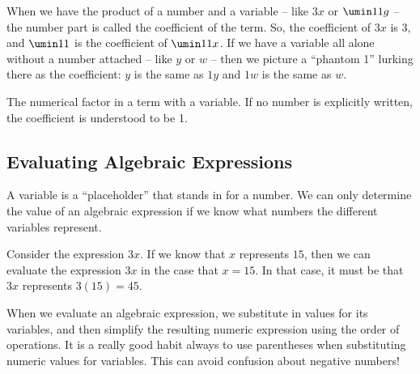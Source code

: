 When we have the product of a number and a variable -- like $3x$ or $\umin11g$ -- the number part is called the \gls{coefficient} of the term. So, the coefficient of $3x$ is 3, and $\umin11$ is the coefficient of $\umin11x$. If we have a variable all alone without a number attached -- like $y$ or $w$ -- then we picture a ``phantom 1'' lurking there as the coefficient: $y$ is the same as $1y$ and $1w$ is the same as $w$.

\begin{boxeddef}[Coefficient]
The numerical factor in a term with a variable. If no number is explicitly written, the coefficient is understood to be 1.
\end{boxeddef}

\subsection{Evaluating Algebraic Expressions}

A variable is a ``placeholder'' that stands in for a number. We can only determine the value of an algebraic expression if we know what numbers the different variables represent.

Consider the expression $3x$. If we know that $x$ represents $15$, then we can \gls{evaluate} the expression $3x$ in the case that $x = 15$. In that case, it must be that $3x$ represents $3(15) = 45$.

When we evaluate an algebraic expression, we substitute in values for its variables, and then simplify the resulting numeric expression using the order of operations. It is a really good habit always to use parentheses when substituting numeric values for variables. This can avoid confusion about negative numbers!

